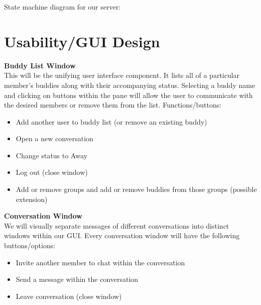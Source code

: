\documentclass[11pt,letterpaper]{article}
\begin{document}
State machine diagram for our server:
\begin{center}
\end{center}

\section{Usability/GUI Design}


{\bf Buddy List Window}\\
This will be the unifying user interface component.  It lists all of a particular member's buddies along with their accompanying status.
Selecting a buddy name and clicking on buttons within the pane will allow the user to communicate with the desired members or remove them
from the list.  Functions/buttons:
\begin{itemize}
\item Add another user to buddy list (or remove an existing buddy) 
\item Open a new conversation
\item Change status to Away
\item Log out (close window)
\item Add or remove groups and add or remove buddies from those groups (possible extension)
\end{itemize}

{\bf Conversation Window}\\
We will visually separate messages of different conversations into distinct windows within our GUI.  Every conversation window will have the following buttons/options:\begin{itemize}
\item Invite another member to chat within the conversation
\item Send a message within the conversation
\item Leave conversation (close window)
\end{itemize}
\end{document}
